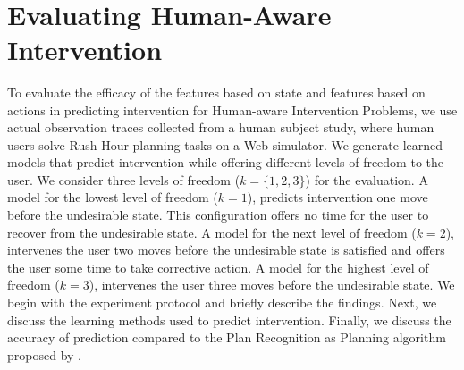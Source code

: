 ~\section{Evaluating Human-Aware Intervention}
\label{sec:evaluating-hai}
To evaluate the efficacy of the features based on state and features based on actions in predicting intervention for Human-aware Intervention Problems, we use actual observation traces collected from a human subject study, where human users solve Rush Hour planning tasks on a Web simulator.
We generate learned models that predict intervention while offering different levels of freedom to the user. 
We consider three levels of freedom ($k=\lbrace 1,2,3 \rbrace$) for the evaluation. 
A model for the lowest level of freedom ($k=1$), predicts intervention one move before the undesirable state. 
This configuration offers no time for the user to recover from the undesirable state. 
A model for the next level of freedom ($k=2$), intervenes the user two moves before the undesirable state is satisfied and offers the user some time to take corrective action. 
A model for the highest level of freedom ($k=3$), intervenes the user three moves before the undesirable state.
We begin with the experiment protocol and briefly describe the findings. 
Next, we discuss the learning methods used to predict intervention. Finally, we discuss the accuracy of prediction compared to the Plan Recognition as Planning algorithm proposed by \cite{ramirez2010probabilistic}.

